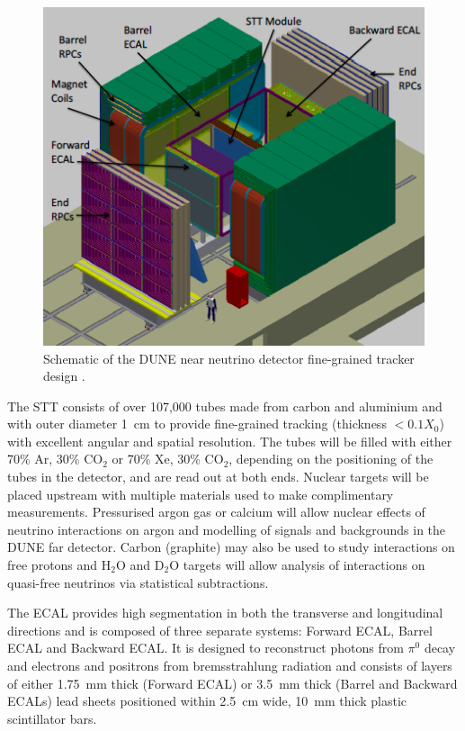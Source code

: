\begin{figure}
  \centering
  \includegraphics[width=12cm]{DUNENearDetector.png}
  \caption[Schematic of the DUNE near neutrino detector fine-grained tracker design.]{Schematic of the DUNE near neutrino detector fine-grained tracker design \cite{DUNECDR4}.}
  \label{fig:DUNENearDetector}
\end{figure}

The STT consists of over 107,000 tubes made from carbon and aluminium and with outer diameter 1~cm to provide fine-grained tracking (thickness $<0.1X_0$) with excellent angular and spatial resolution.  The tubes will be filled with either 70\% Ar, 30\% CO$_2$ or 70\% Xe, 30\% CO$_2$, depending on the positioning of the tubes in the detector, and are read out at both ends.  Nuclear targets will be placed upstream with multiple materials used to make complimentary measurements.  Pressurised argon gas or calcium will allow nuclear effects of neutrino interactions on argon and modelling of signals and backgrounds in the DUNE far detector.  Carbon (graphite) may also be used to study interactions on free protons and H$_2$O and D$_2$O targets will allow analysis of interactions on quasi-free neutrinos via statistical subtractions.

The ECAL provides high segmentation in both the transverse and longitudinal directions and is composed of three separate systems: Forward ECAL, Barrel ECAL and Backward ECAL.  It is designed to reconstruct photons from $\pi^0$ decay and electrons and positrons from bremsstrahlung radiation and consists of layers of either 1.75~mm thick (Forward ECAL) or 3.5~mm thick (Barrel and Backward ECALs) lead sheets positioned within 2.5~cm wide, 10~mm thick plastic scintillator bars.

